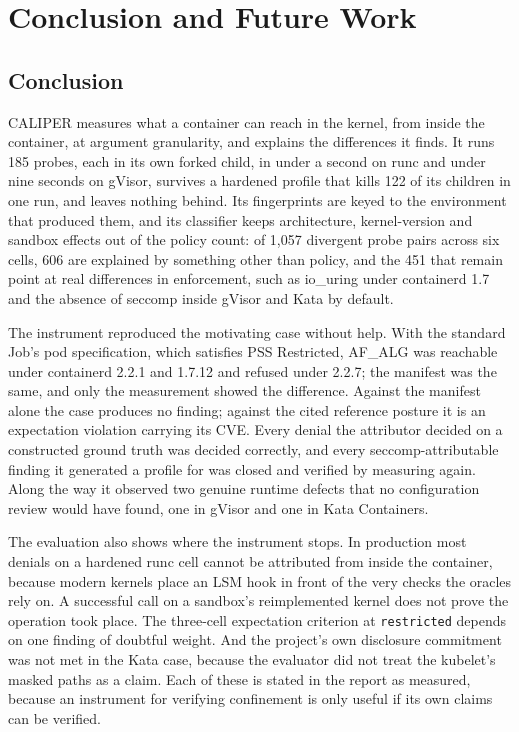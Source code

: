 \chapter{Conclusion and Future Work}
\label{ch:conclusion}

\section{Conclusion}

CALIPER measures what a container can reach in the kernel, from inside the container, at argument granularity, and explains the differences it finds. It runs 185 probes, each in its own forked child, in under a second on runc and under nine seconds on gVisor, survives a hardened profile that kills 122 of its children in one run, and leaves nothing behind. Its fingerprints are keyed to the environment that produced them, and its classifier keeps architecture, kernel-version and sandbox effects out of the policy count: of 1,057 divergent probe pairs across six cells, 606 are explained by something other than policy, and the 451 that remain point at real differences in enforcement, such as io\_uring under containerd 1.7 and the absence of seccomp inside gVisor and Kata by default.

The instrument reproduced the motivating case without help. With the standard Job's pod specification, which satisfies PSS Restricted, AF\_ALG was reachable under containerd 2.2.1 and 1.7.12 and refused under 2.2.7; the manifest was the same, and only the measurement showed the difference. Against the manifest alone the case produces no finding; against the cited reference posture it is an expectation violation carrying its CVE. Every denial the attributor decided on a constructed ground truth was decided correctly, and every seccomp-attributable finding it generated a profile for was closed and verified by measuring again. Along the way it observed two genuine runtime defects that no configuration review would have found, one in gVisor and one in Kata Containers.

The evaluation also shows where the instrument stops. In production most denials on a hardened runc cell cannot be attributed from inside the container, because modern kernels place an LSM hook in front of the very checks the oracles rely on. A successful call on a sandbox's reimplemented kernel does not prove the operation took place. The three-cell expectation criterion at \texttt{restricted} depends on one finding of doubtful weight. And the project's own disclosure commitment was not met in the Kata case, because the evaluator did not treat the kubelet's masked paths as a claim. Each of these is stated in the report as measured, because an instrument for verifying confinement is only useful if its own claims can be verified.

